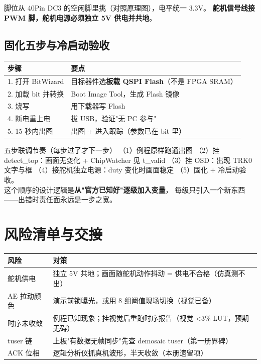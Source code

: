 脚位从 40Pin DC3 的空闲脚里挑（对照原理图），电平统一 3.3V。
\textbf{舵机信号线接 PWM 脚，舵机电源必须独立 5V 供电并共地}。

\subsection{固化五步与冷启动验收}

\begin{center}
\begin{tabular}{ll}
\toprule
\rowcolor{rowtint}\textbf{步骤} & \textbf{要点} \\
\midrule
1. 打开 BitWizard & 目标器件选\textbf{板载 QSPI Flash}（不是 FPGA SRAM） \\
2. 加载 bit 并转换 & Boot Image Tool，生成 Flash 镜像 \\
3. 烧写 & 用下载器写 Flash \\
4. 断电重上电 & 拔 USB，验证"无 PC 参与" \\
5. 15 秒内出图 & 出图 + 进入跟踪（参数已在 bit 里） \\
\bottomrule
\end{tabular}
\end{center}

\begin{keybox}{五步联调节奏（每步过了才下一步）}
（1）例程原样跑通出图 \code{->}（2）挂 detect\_top：画面无变化 +
ChipWatcher 见 t\_valid \code{->}（3）挂 OSD：出现 TRK0 文字与框
\code{->}（4）接舵机独立电源：duty 变化时画面稳定
\code{->}（5）固化 + 冷启动验收。\\[4pt]
这个顺序的设计逻辑是\textbf{从"官方已知好"逐级加入变量}，
每级只引入一个新东西——出错时责任面永远是一步之宽。
\end{keybox}

\section{风险清单与交接}

\begin{center}
\begin{tabular}{lp{8.4cm}}
\toprule
\rowcolor{rowtint}\textbf{风险} & \textbf{对策} \\
\midrule
舵机供电 & 独立 5V 共地；画面随舵机动作抖动 = 供电不合格（仿真测不出） \\
AE 拉动颜色 & 演示前锁曝光，或用 8 组阈值现场切换（视觉已备） \\
时序未收敛 & 例程已知现象；挂视觉后重跑时序报告（视觉 <3\% LUT，预期无碍） \\
tuser 链 & 上板"有数据无帧同步"先查 demosaic tuser（第一册界碑） \\
ACK 位相 & 逻辑分析仪抓真机波形，半天收敛（本册遗留项） \\
\bottomrule
\end{tabular}
\end{center}

